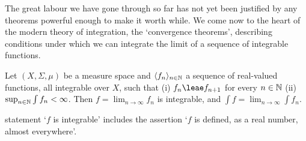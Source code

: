 
\def\chaptername{Integration}
\def\sectionname{The convergence theorems}


The great labour we have gone through so far has not yet been justified
by any theorems powerful enough to make it worth while.   We come now to
the heart of the modern theory of integration,  the `convergence
theorems', describing conditions under which we can integrate the
limit of a sequence of integrable functions.

 Let $(X,\Sigma,\mu)$ be a measure space
and $\langle f_n\rangle_{n\in\Bbb N}$ a sequence of real-valued
functions, all integrable over $X$, such that (i) $f_n\leae f_{n+1}$
for every $n\in\Bbb N$ (ii)
$\sup_{n\in\Bbb N}\int f_n<\infty$.   Then $f=\lim_{n\to\infty}f_n$ is
integrable, and $\int f=\lim_{n\to\infty}\int f_n$.

\medskip

   statement
`$f$ is integrable' includes the assertion `$f$ is defined, as a
real number, almost everywhere'.

